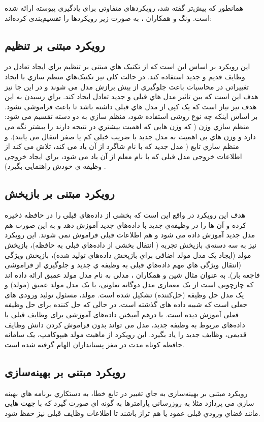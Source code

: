 همانطور که پیش‌تر گفته شد، رویکردهای متفاوتی برای یادگیری پیوسته ارائه شده است. ونگ و همکاران 
\cite{1}
، به صورت زیر رویکردها را تقسیم‌بندی کرده‌اند:
\subsection{رویکرد مبتنی بر تنظیم}
این رویکرد بر اساس این است که از تکنیک هاي مبتنی بر تنظیم
براي ایجاد تعادل در وظایف قدیم و جدید استفاده کند. در حالت کلی نیز تکنیک‌هاي منظم سازي با ایجاد تغییراتی در محاسبات باعث جلوگیري از بیش برازش مدل می شوند و در این جا نیز هدف این است که بین تاثیر مدل هاي قبلی و جدید تعادل ایجاد کند. براي رسیدن به این هدف نیز نیاز است که یک کپی از مدل هاي قبلی داشته باشد تا باعث فراموشی نشود. بر اساس اینکه چه نوع روشی استفاده شود، منظم سازي به دو دسته تقسیم می شود: منظم سازي وزن ( که وزن هایی که اهمیت بیشتري در نتیجه دارند را بیشتر نگه می دارد و وزن هاي بی اهمیت به مدل جدید با ضریب خیلی کم یا صفر انتقال می یابند). و منظم سازي تابع ( مدل جدید که با نام شاگرد از آن یاد می کند، تلاش می کند از اطلاعات خروجی مدل قبلی که با نام معلم از آن یاد می شود، براي ایجاد خروجی وظیفه ي خودش راهنمایی بگیرد) 
\cite{7,8}.
\subsection{رویکرد مبتنی بر بازپخش}
هدف این رویکرد در واقع این است که بخشی از داده‌هاي قبلی را در حافظه ذخیره کرده و آن ها را در وظیفه‌ي جدید با داده‌هاي جدید آموزش دهد و به این صورت هم مدل جدید آموزش داده می شود و هم اطلاعات قبلی فراموش نمی شوند. این رویکرد نیز به سه دسته‌ي بازپخش تجربه 
( انتقال بخشی از داده‌هاي قبلی به حافظه)، بازپخش مولد 
(ایجاد یک مدل مولد اضافی براي بازپخش داده‌هاي تولید شده)، بازپخش ویژگی 
(انتقال ویژگی هاي مهم داده‌هاي قبلی به وظیفه ي جدید و جلوگیري از فراموشی فاجعه بار). به عنوان مثال شین و همکاران 
\cite{9}
، مدلی به نام مدل مولد عمیق ارائه داده اند که چارچوبی است از یک معماری مدل دوگانه تعاونی، با یک مدل مولد عمیق (مولد) و یک مدل حل وظیفه (حل‌کننده) تشکیل شده است. مولد، مسئول تولید ورودی های جعلی است که شبیه داده های گذشته است، در حالی که حل کننده برای حل وظیفه فعلی آموزش دیده است.  با درهم آمیختن داده‌های آموزشی برای وظایف قبلی با داده‌های مربوط به وظیفه جدید، مدل می تواند بدون فراموش کردن دانش وظایف قدیمی، وظایف جدید را یاد بگیرد. این رویکرد از ماهیت مولد هیپوکامپ، یک سامانه حافظه کوتاه مدت در مغز پستانداران الهام گرفته شده است. 
\subsection{رویکرد مبتنی بر بهینه‌سازی}
رویکرد مبتنی بر بهینه‌سازی 
به جاي تغییر در تابع خطا، به دستکاري برنامه هاي بهینه سازي می پردازد مثلا به روزرسانی پارامتر‌ها
 به گونه اي صورت گیرد که با جهت هایی مانند فضاي ورودي قبلی عمود یا هم تراز باشند تا اطلاعات وظایف قبلی نیز حفظ شود. 

